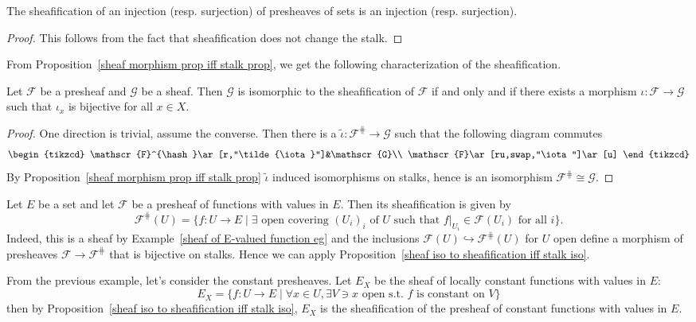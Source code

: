 \begin{proposition}\label{sheaf sheafification on morphism prop}
The sheafification of an injection (resp. surjection) of presheaves of sets is an injection (resp. surjection).
\end{proposition}
\begin{proof}
This follows from the fact that sheafification does not change the stalk.
\end{proof}
From Proposition~\ref{sheaf morphism prop iff stalk prop}, we get the following characterization of the sheafification.
\begin{proposition}\label{sheaf iso to sheafification iff stalk iso}
Let $\mathscr{F}$ be a presheaf and $\mathscr{G}$ be a sheaf. Then $\mathscr{G}$ is isomorphic to the sheafification of $\mathscr{F}$ if and only and if there exists a morphism $\iota:\mathscr{F}\to\mathscr{G}$ such that $\iota_x$ is bijective for all $x\in X$.
\end{proposition}
\begin{proof}
One direction is trivial, assume the converse. Then there is a $\tilde{\iota}:\mathscr{F}^{\hash}\to\mathscr{G}$ such that the following diagram commutes
\[\begin{tikzcd}
\mathscr{F}^{\hash}\ar[r,"\tilde{\iota}"]&\mathscr{G}\\
\mathscr{F}\ar[ru,swap,"\iota"]\ar[u]
\end{tikzcd}\]
By Proposition~\ref{sheaf morphism prop iff stalk prop} $\tilde{\iota}$ induced isomorphisms on stalks, hence is an isomorphism $\mathscr{F}^{\hash}\cong\mathscr{G}$.
\end{proof}
\begin{example}\label{sheafification presheaf of function}
Let $E$ be a set and let $\mathscr{F}$ be a presheaf of functions with values in $E$. Then its sheafification is given by
\[\mathscr{F}^{\hash}(U)=\{f:U\to E\mid\exists\text{ open covering $(U_i)_i$ of $U$ such that $f|_{U_i}\in\mathscr{F}(U_i)$ for all $i$}\}.\]
Indeed, this is a sheaf by Example~\ref{sheaf of E-valued function eg} and the inclusions $\mathscr{F}(U)\hookrightarrow\mathscr{F}^{\hash}(U)$ for $U$ open define a morphism of presheaves $\mathscr{F}\to\mathscr{F}^{\hash}$ that is bijective on stalks. Hence we can apply Proposition~\ref{sheaf iso to sheafification iff stalk iso}.
\end{example}
\begin{example}
From the previous example, let's consider the constant presheaves. Let $E_{X}$ be the sheaf of locally constant functions with values in $E$:
\[E_X=\{f:U\to E\mid \forall x\in U,\exists V\ni x\text{ open s.t. $f$ is constant on $V$}\}\]
then by Proposition~\ref{sheaf iso to sheafification iff stalk iso}, $E_X$ is the sheafification of the presheaf of constant functions with values in $E$.
\end{example}

